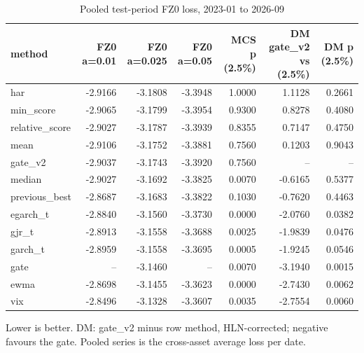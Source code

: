 \begin{table}[t]
\centering
\small
\caption{Pooled test-period FZ0 loss, 2023-01 to 2026-09}
\label{tab:main}
\begin{tabular}{lrrrrrr}
\toprule
method & FZ0 a=0.01 & FZ0 a=0.025 & FZ0 a=0.05 & MCS p (2.5\%) & DM gate\_v2 vs (2.5\%) & DM p (2.5\%) \\
\midrule
har & -2.9166 & -3.1808 & -3.3948 & 1.0000 & 1.1128 & 0.2661 \\
min\_score & -2.9065 & -3.1799 & -3.3954 & 0.9300 & 0.8278 & 0.4080 \\
relative\_score & -2.9027 & -3.1787 & -3.3939 & 0.8355 & 0.7147 & 0.4750 \\
mean & -2.9106 & -3.1752 & -3.3881 & 0.7560 & 0.1203 & 0.9043 \\
gate\_v2 & -2.9037 & -3.1743 & -3.3920 & 0.7560 & -- & -- \\
median & -2.9027 & -3.1692 & -3.3825 & 0.0070 & -0.6165 & 0.5377 \\
previous\_best & -2.8687 & -3.1683 & -3.3822 & 0.1030 & -0.7620 & 0.4463 \\
egarch\_t & -2.8840 & -3.1560 & -3.3730 & 0.0000 & -2.0760 & 0.0382 \\
gjr\_t & -2.8913 & -3.1558 & -3.3688 & 0.0025 & -1.9839 & 0.0476 \\
garch\_t & -2.8959 & -3.1558 & -3.3695 & 0.0005 & -1.9245 & 0.0546 \\
gate & -- & -3.1460 & -- & 0.0070 & -3.1940 & 0.0015 \\
ewma & -2.8698 & -3.1455 & -3.3623 & 0.0000 & -2.7430 & 0.0062 \\
vix & -2.8496 & -3.1328 & -3.3607 & 0.0035 & -2.7554 & 0.0060 \\
\bottomrule
\end{tabular}
\par\footnotesize Lower is better. DM: gate_v2 minus row method, HLN-corrected; negative favours the gate. Pooled series is the cross-asset average loss per date.
\end{table}

